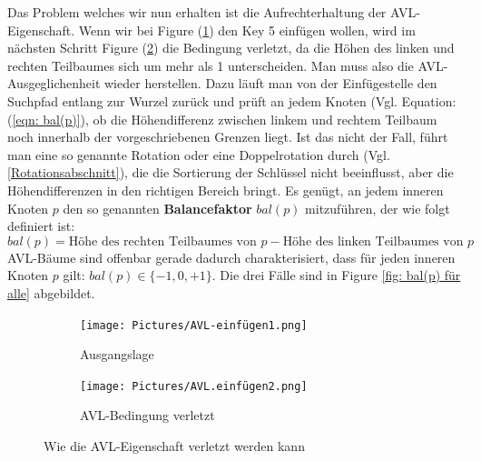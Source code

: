 \documentclass[a4paper]{article}
\begin{document}
Das Problem welches wir nun erhalten ist die Aufrechterhaltung der AVL-Eigenschaft. Wenn wir bei Figure (\ref{fig: AVL-ausgangslage}) den Key 5 einfügen wollen, wird im nächsten Schritt Figure (\ref{fig:AVL-verletzt}) die Bedingung verletzt, da die Höhen des linken und rechten Teilbaumes sich um mehr als 1 unterscheiden. Man muss also die AVL-Ausgeglichenheit wieder herstellen. Dazu läuft man von der Einfügestelle den Suchpfad entlang zur Wurzel zurück und prüft an jedem Knoten (Vgl. Equation: (\ref{eqn: bal(p)}), ob die Höhendifferenz  zwischen linkem und rechtem Teilbaum noch innerhalb der vorgeschriebenen Grenzen liegt. Ist das nicht der Fall, führt man eine so genannte Rotation oder eine Doppelrotation durch (Vgl. \ref{Rotationsabschnitt}), die die Sortierung der Schlüssel nicht beeinflusst, aber die Höhendifferenzen in den richtigen Bereich bringt.
 Es genügt, an jedem inneren Knoten $p$ den so genannten \textbf{Balancefaktor} $bal(p)$ mitzuführen, der wie folgt definiert ist:
\begin{equation} \label{eqn: bal(p)}
    bal(p) = \text{Höhe des rechten Teilbaumes von } p - \text{Höhe des linken Teilbaumes von } p
\end{equation}
AVL-Bäume sind offenbar gerade dadurch charakterisiert, dass für jeden inneren Knoten $p$ gilt: $bal(p) \in \{ -1, 0, +1\}$. Die drei Fälle sind in Figure \ref{fig: bal(p) für alle} abgebildet.


\begin{figure}[h] 
   \centering
     \begin{subfigure}[h]{0.5\textwidth}
         \centering
         \texttt{[image: Pictures/AVL-einfügen1.png]}
         \caption{Ausgangslage}
         \label{fig: AVL-ausgangslage}
     \end{subfigure}
     \hfill
     \begin{subfigure}[h]{0.45\textwidth}
         \centering
         \texttt{[image: Pictures/AVL.einfügen2.png]}         \caption{AVL-Bedingung verletzt}
         \label{fig:AVL-verletzt}
     \end{subfigure}
     \caption{Wie die AVL-Eigenschaft verletzt werden kann}
    \label{fig: AVL-ausgangslage-verletzt}
\end{figure}
\end{document}
